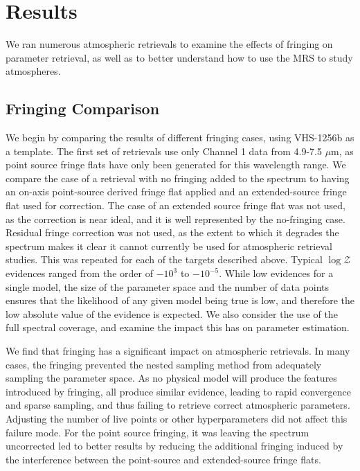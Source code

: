 \section{Results}
We ran numerous atmospheric retrievals to examine the effects of fringing on parameter retrieval, as well as to better understand how to use the MRS to study atmospheres.

\subsection{Fringing Comparison}
We begin by comparing the results of different fringing cases, using VHS-1256b as a template.
The first set of retrievals use only Channel 1 data from 4.9-7.5 $\mu$m, as point source fringe flats have only been generated for this wavelength range.
We compare the case of a retrieval with no fringing added to the spectrum to having an on-axis point-source derived fringe flat applied and an extended-source fringe flat used for correction.
The case of an extended source fringe flat was not used, as the correction is near ideal, and it is well represented by the no-fringing case.
Residual fringe correction was not used, as the extent to which it degrades the spectrum makes it clear it cannot currently be used for atmospheric retrieval studies.
This was repeated for each of the targets described above.
Typical $\log\mathcal{Z}$ evidences ranged from the order of $-10^{3}$ to $-10^{-5}$.
While low evidences for a single model, the size of the parameter space and the number of data points ensures that the likelihood of any given model being true is low, and therefore the low absolute value of the evidence is expected. 
We also consider the use of the full spectral coverage, and examine the impact this has on parameter estimation.

We find that fringing has a significant impact on atmospheric retrievals.
In many cases, the fringing prevented the nested sampling method from adequately sampling the parameter space.
As no physical model will produce the features introduced by fringing, all produce similar evidence, leading to rapid convergence and sparse sampling, and thus failing to retrieve correct atmospheric parameters. 
Adjusting the number of live points or other hyperparameters did not affect this failure mode.
For the point source fringing, it was leaving the spectrum uncorrected led to better results by reducing the additional fringing induced by the interference between the point-source and extended-source fringe flats.

